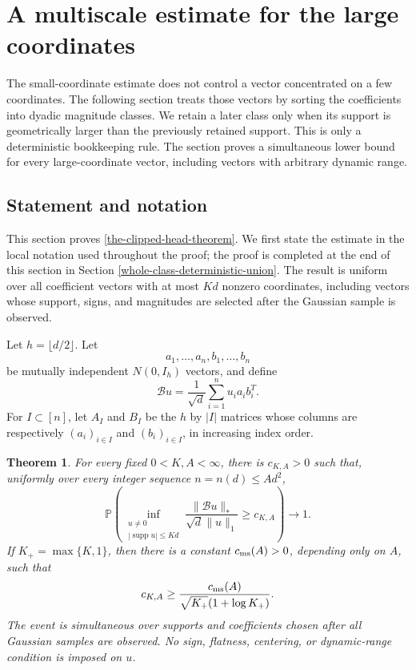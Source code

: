 \documentclass[11pt]{article}
\numberwithin{equation}{section}
\newtheorem{theorem}{Theorem}[section]
\theoremstyle{definition}
\theoremstyle{remark}
\newcommand{\Pp}{\mathbb P}
\newcommand{\1}{\boldsymbol 1}
\begin{document}

\section{A multiscale estimate for the large
  coordinates}\label{expert-multiscale-module}

\begin{aiblock}

The small-coordinate estimate does not control a vector
concentrated on a few coordinates. The following section
treats those vectors by sorting the coefficients into
dyadic magnitude classes. We retain a later class only
when its support is geometrically larger than the
previously retained support. This is only a deterministic
bookkeeping rule. The section proves a simultaneous lower
bound for every large-coordinate vector, including vectors
with arbitrary dynamic range.

\subsection{Statement and
  notation}\label{statement-and-notation}

This section proves \cref{the-clipped-head-theorem}. We
first state the estimate in the local notation used
throughout the proof; the proof is completed at the end of
this section in Section \ref{whole-class-deterministic-union}.
The result is uniform over all coefficient vectors with at
most $Kd$ nonzero coordinates, including vectors whose
support, signs, and magnitudes are selected after the
Gaussian sample is observed.

Let $h=\lfloor d/2\rfloor$. Let
\[
  a_1,\ldots,a_n,b_1,\ldots,b_n
\]
be mutually independent $N(0,I_h)$ vectors, and define
\[
  \mathcal{B}u=\frac1{\sqrt d}\sum_{i=1}^n u_i a_i
  b_i^T.
\]
For $I\subset[n]$, let $A_I$ and $B_I$ be the $h$ by
$|I|$ matrices whose columns are respectively
$(a_i)_{i\in I}$ and $(b_i)_{i\in I}$, in increasing
index order.

\begin{theorem}\label{main-theorem-6-1}
  For every fixed $0<K,A<\infty$, there is $c_{K,A}>0$
  such that, uniformly over every integer sequence
  $n=n(d)\le Ad^2$,
  \[
    \Pp\left(\inf_{\substack{u\ne0\\
    |\operatorname{supp}u|\le
    Kd}}\frac{\|\mathcal{B}u\|_*}{\sqrt d\|u\|_1}\ge
    c_{K,A}\right)\longrightarrow1.
  \]
  If $K_+=\max\{K,1\}$, then there is a constant
  $c_{\rm ms}(A)>0$, depending only on $A$, such that
  \[
    c_{K,A}\ge\frac{c_{\rm ms}(A)}{\sqrt{K_+}(1+\log
    K_+)}.
  \]
  The event is simultaneous over supports and
  coefficients chosen after all Gaussian samples are
  observed. No sign, flatness, centering, or
  dynamic-range condition is imposed on $u$.
\end{theorem}


\end{aiblock}
\end{document}
